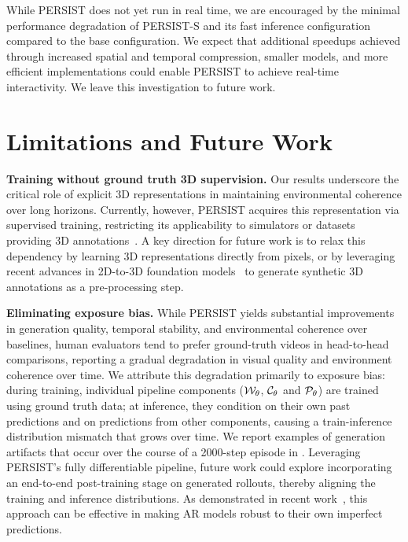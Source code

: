\documentclass{article}
\theoremstyle{plain}
\theoremstyle{definition}
\theoremstyle{remark}
\begin{document}
While PERSIST does not yet run in real time, we are encouraged by the minimal performance degradation of PERSIST-S and its fast inference configuration compared to the base configuration. We expect that additional speedups achieved through increased spatial and temporal compression, smaller models, and more efficient implementations could enable PERSIST to achieve real-time interactivity. We leave this investigation to future work.

\section{Limitations and Future Work}\label{app:limitations}

\textbf{Training without ground truth 3D supervision.} Our results underscore the critical role of explicit 3D representations in maintaining environmental coherence over long horizons. Currently, however, PERSIST acquires this representation via supervised training, restricting its applicability to simulators or datasets providing 3D annotations~\citep[e.g.][]{zhou2018stereo,Matterport3D,yeshwanth2023scannet++}. A key direction for future work is to relax this dependency by learning 3D representations directly from pixels, or by leveraging recent advances in 2D-to-3D foundation models~\citep{wang2025vggt,sam3dteam2025sam3d3dfyimages} to generate synthetic 3D annotations as a pre-processing step.

\textbf{Eliminating exposure bias.} While PERSIST yields substantial improvements in generation quality, temporal stability, and environmental coherence over baselines, human evaluators tend to prefer ground-truth videos in head-to-head comparisons, reporting a gradual degradation in visual quality and environment coherence over time. We attribute this degradation primarily to exposure bias: during training, individual pipeline components (${\mathcal{W}}_\theta$, ${\mathcal{C}}_\theta$ and ${\mathcal{P}}_\theta$) are trained using ground truth data; at inference, they condition on their own past predictions and on predictions from other components, causing a train-inference distribution mismatch that grows over time. We report examples of generation artifacts that occur over the course of a 2000-step episode in . Leveraging PERSIST's fully differentiable pipeline, future work could explore incorporating an end-to-end post-training stage on generated rollouts, thereby aligning the training and inference distributions. As demonstrated in recent work~\citep{huang2025self}, this approach can be effective in making AR models robust to their own imperfect predictions.
\end{document}
